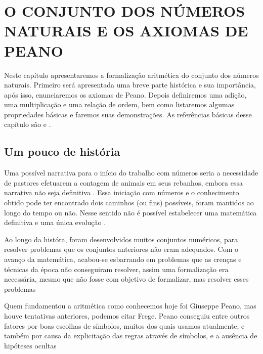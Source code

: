\documentclass[../main.tex]{subfiles}
\begin{document}
\chapter{O CONJUNTO DOS NÚMEROS NATURAIS E OS AXIOMAS DE PEANO}
Neste capítulo apresentaremos a formalização aritmética do conjunto dos números naturais. Primeiro será apresentada uma breve parte histórica e sua importância, após isso, enunciaremos os axiomas de Peano. Depois definiremos uma adição, uma multiplicação e uma relação de ordem, bem como listaremos algumas propriedades básicas e faremos suas demonstrações. As referências básicas desse capítulo são \textcite{domingues-2009} e \textcite{ferreira}.

\section{Um pouco de história}

Uma possível narrativa para o início do trabalho com números seria a necessidade de pastores efetuarem a contagem de animais em seus rebanhos, embora essa narrativa não seja definitiva \Cite{roque}. Essa iniciação com números e o conhecimento obtido pode ter encontrado dois caminhos (ou fins) possíveis, foram mantidos ao longo do tempo ou não. Nesse sentido não é possível estabelecer uma matemática definitiva e uma única evolução \Cite[p. 35]{roque}. 

Ao longo da históra, foram desenvolvidos muitos conjuntos numéricos, para resolver problemas que os conjuntos anteriores não eram adequados. 
Com o avanço da matemática, acabou-se esbarrando em problemas que as crenças e técnicas da época não conseguiram resolver, assim uma formalização era necessária, mesmo que não fosse com objetivo de formalizar, mas resolver esses problemas \textcite[p. 407]{roque}

Quem fundamentou a aritmética como conhecemos hoje foi Giuseppe Peano, mas houve tentativas anteriores, podemos citar Frege. 
Peano conseguiu entre outros fatores por boas escolhas de símbolos, muitos dos quais usamos atualmente, e também por causa da explicitação das regras através de símbolos, e a ausência de hipóteses ocultas \textcite[p. 415]{boyer}
\end{document}

